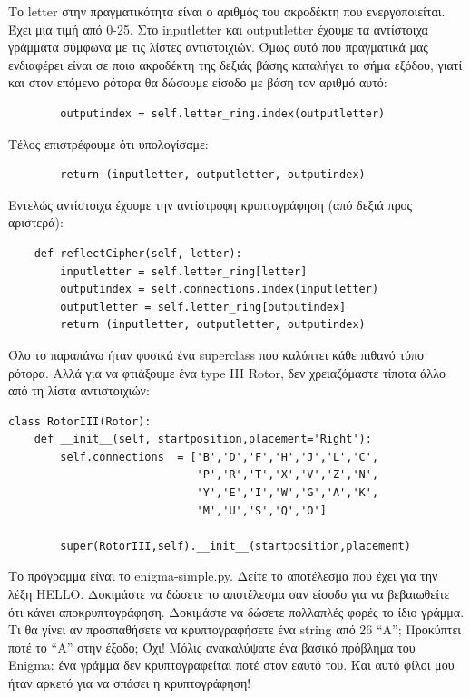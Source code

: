 \documentclass[a4paper,twoside,12pt]{article}
\begin{document}
Το letter στην πραγματικότητα είναι ο αριθμός του ακροδέκτη που ενεργοποιείται. Έχει μια τιμή από 0-25. Στο inputletter και outputletter έχουμε τα αντίστοιχα γράμματα σύμφωνα με τις λίστες αντιστοιχιών. Όμως αυτό που πραγματικά μας ενδιαφέρει είναι σε ποιο ακροδέκτη της δεξιάς βάσης καταλήγει το σήμα εξόδου, γιατί και στον επόμενο ρότορα θα δώσουμε είσοδο με βάση τον αριθμό αυτό:

\begin{verbatim}
        outputindex = self.letter_ring.index(outputletter)
\end{verbatim}

Τέλος επιστρέφουμε ότι υπολογίσαμε:

\begin{verbatim}
        return (inputletter, outputletter, outputindex)
\end{verbatim}

Εντελώς αντίστοιχα έχουμε την αντίστροφη κρυπτογράφηση (από δεξιά προς αριστερά):

\begin{verbatim}
    def reflectCipher(self, letter):
        inputletter = self.letter_ring[letter]
        outputindex = self.connections.index(inputletter)
        outputletter = self.letter_ring[outputindex]
        return (inputletter, outputletter, outputindex)
\end{verbatim}

Όλο το παραπάνω ήταν φυσικά ένα superclass που καλύπτει κάθε πιθανό τύπο ρότορα. Αλλά για να φτιάξουμε ένα type III Rotor, δεν χρειαζόμαστε τίποτα άλλο από τη λίστα αντιστοιχιών:

\begin{verbatim}
class RotorIII(Rotor):
    def __init__(self, startposition,placement='Right'):
        self.connections  = ['B','D','F','H','J','L','C',
                             'P','R','T','X','V','Z','N',
                             'Y','E','I','W','G','A','K',
                             'M','U','S','Q','O']

        super(RotorIII,self).__init__(startposition,placement)
\end{verbatim}

Το πρόγραμμα είναι το enigma-simple.py. Δείτε το αποτέλεσμα που έχει για την λέξη HELLO. Δοκιμάστε να δώσετε το αποτέλεσμα σαν είσοδο για να βεβαιωθείτε ότι κάνει αποκρυπτογράφηση. Δοκιμάστε να δώσετε πολλαπλές φορές το ίδιο γράμμα. Τι θα γίνει αν προσπαθήσετε να κρυπτογραφήσετε ένα string από 26 “Α”; Προκύπτει ποτέ το “Α” στην έξοδο; Όχι! Μόλις ανακαλύψατε ένα βασικό πρόβλημα του Enigma: ένα γράμμα δεν κρυπτογραφείται ποτέ στον εαυτό του. Και αυτό φίλοι μου ήταν αρκετό για να σπάσει η κρυπτογράφηση!
\end{document}
